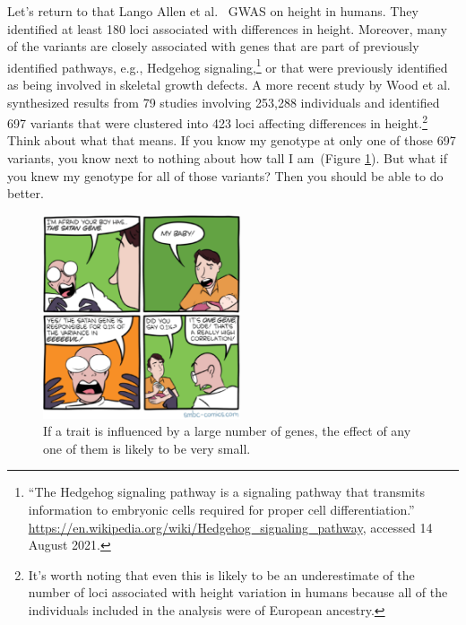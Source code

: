 \documentclass[12pt]{article}
\begin{document}
Let's return to that Lango Allen et al.~\cite{LangoAllen-etal-2010}
GWAS on height in humans. They identified at least 180 loci associated
with differences in height. Moreover, many of the variants are closely
associated with genes that are part of previously identified pathways,
e.g., Hedgehog signaling,\footnote{``The Hedgehog signaling pathway is
  a signaling pathway that transmits information to embryonic cells
  required for proper cell differentiation.''
  \url{https://en.wikipedia.org/wiki/Hedgehog_signaling_pathway},
  accessed 14 August 2021.} or that were previously identified as
being involved in skeletal growth defects. A more recent study by Wood
et al.~\cite{Wood-etal-2014} synthesized results from 79 studies
involving 253,288 individuals and identified 697 variants that were
clustered into 423 loci affecting differences in height.\footnote{It's
  worth noting that even this is likely to be an underestimate of the
  number of loci associated with height variation in humans because
  all of the individuals included in the analysis were of European
  ancestry.} Think about what that means. If you know my genotype at
only one of those 697 variants, you know next to nothing about how
tall I am~(Figure \ref{fig:GWAS-small-effect}). But what if you knew
my genotype for all of those variants? Then you should be able to do
better.

\begin{figure}
  \begin{center}
    \includegraphics[height=6cm]{GWAS-small-effect.eps}
  \end{center}
  \caption{If a trait is influenced by a large number of genes, the
    effect of any one of them is likely to be very small.}\label{fig:GWAS-small-effect}
\end{figure}
\end{document}
